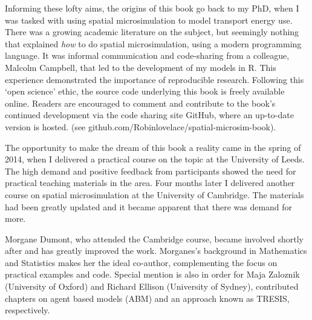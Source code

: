 Informing these lofty aims, the origins of this book go back to my PhD, when
I was tasked with using spatial microsimulation to model transport energy use.
There was a growing academic literature on the subject,
but seemingly nothing that explained \emph{how} to do spatial microsimulation,
using a modern programming language.
It was informal communication and code-sharing from a colleague,
Malcolm Campbell, that led to the development of my models in R.
This experience demonstrated the importance of
reproducible research. Following this `open science' ethic,
the source code underlying this book is freely
available online. Readers are encouraged to comment and contribute to
the book's continued development via the code sharing site GitHub, where
an up-to-date version is hosted.
(see github.com/Robinlovelace/spatial-microsim-book).

The opportunity to make the dream of this book a reality came in the spring
of 2014, when I delivered a practical course on the topic at
the University of Leeds.
The high demand and positive feedback from participants
showed the need for practical teaching materials in the area.
Four months later
I delivered another course on spatial microsimulation
at the University of Cambridge.
The materials had been greatly updated
and it became apparent that there was demand for more.

Morgane Dumont, who attended the Cambridge course,
became involved shortly after and has greatly improved the work.
Morganes's background in Mathematics and Statistics makes her the
ideal co-author, complementing the focus on practical examples
and code. Special mention is also in order for Maja Zaloznik
(University of Oxford)
and Richard Ellison (University of Sydney),
contributed chapters on
agent based models (ABM) and an approach known as TRESIS, respectively.

